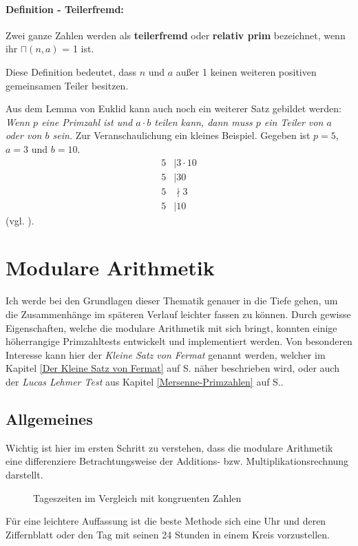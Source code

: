 \documentclass[12pt,a4paper]{article}
\theoremstyle{definition}
\begin{document}
\paragraph{Definition - Teilerfremd:}
Zwei ganze Zahlen werden als \textbf{teilerfremd} oder \textbf{relativ prim} bezeichnet, wenn ihr $\sqcap(n, a)$ = 1 ist.

Diese Definition bedeutet, dass $n$ und $a$ außer 1 keinen weiteren positiven gemeinsamen Teiler besitzen.

Aus dem Lemma von Euklid kann auch noch ein weiterer Satz gebildet werden:
\textit{Wenn $p$ eine Primzahl ist und $a \cdot b$ teilen kann, dann muss $p$ ein Teiler von $a$ oder von $b$ sein.}\newline
Zur Veranschaulichung ein kleines Beispiel. Gegeben ist $p = 5$, $a = 3$ und $b = 10$.
\begin{align}
5 &\mid 3 \cdot 10\\
5 &\mid 30\\
5 &\nmid 3\\
5 &\mid 10
\end{align}
(vgl. \cite[247]{Houston2012}).
\newpage

\section{Modulare Arithmetik}\label{Modulare Arithmetik}
Ich werde bei den Grundlagen dieser Thematik genauer in die Tiefe gehen, um die Zusammenhänge im späteren Verlauf leichter fassen zu können. Durch gewisse Eigenschaften, welche die modulare Arithmetik mit sich bringt, konnten einige höherrangige Primzahltests entwickelt und implementiert werden. Von besonderen Interesse kann hier der \textit{Kleine Satz von Fermat} genannt werden, welcher im Kapitel \ref{Der Kleine Satz von Fermat} auf S. \pageref{Der Kleine Satz von Fermat} näher beschrieben wird, oder auch der \textit{Lucas Lehmer Test} aus Kapitel \ref{Mersenne-Primzahlen} auf S.\pageref{Definition (Lucas-Test)}.

\subsection{Allgemeines}\label{Allgemeines}
Wichtig ist hier im ersten Schritt zu verstehen, dass die modulare Arithmetik eine differenziere Betrachtungsweise der Additions- bzw. Multiplikationsrechnung darstellt.
\begin{figure}[h]
 \centering
 \caption{Tageszeiten im Vergleich mit kongruenten Zahlen}
 \label{fig:Tageszeiten im Vergleich mit kongruenten Zahlen}
 \autocite[298]{Meinel2011}
\end{figure}
Für eine leichtere Auffassung ist die beste Methode sich eine Uhr und deren Ziffernblatt oder den Tag mit seinen 24 Stunden in einem Kreis vorzustellen.
\end{document}
